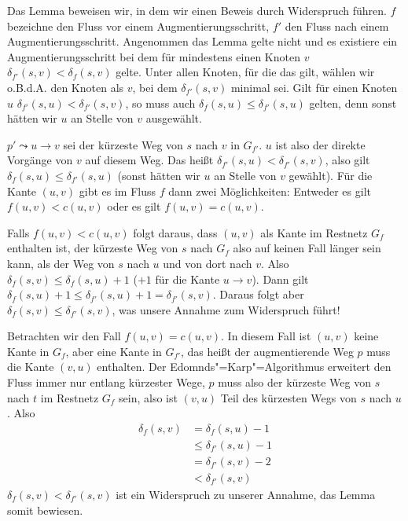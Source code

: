 \begin{Bew}
  \hspace{\parindent} Das Lemma beweisen wir, in dem wir einen Beweis durch Widerspruch führen. $f$ bezeichne den Fluss vor einem Augmentierungsschritt, $f'$ den Fluss nach einem Augmentierungsschritt. Angenommen das Lemma gelte nicht und es existiere ein Augmentierungsschritt bei dem für mindestens einen Knoten $v$ $\delta_{f'}(s,v) < \delta_{f}(s,v)$ gelte. Unter allen Knoten, für die das gilt, wählen wir o.B.d.A. den Knoten als $v$, bei dem $\delta_{f'}(s,v)$ minimal sei. Gilt für einen Knoten $u$ $\delta_{f'}(s,u) < \delta_{f'}(s,v)$, so muss auch $\delta_f(s,u) \le \delta_{f'}(s,u)$ gelten, denn sonst hätten wir $u$ an Stelle von $v$ ausgewählt.
  
  $p' \leadsto u \to v$ sei der kürzeste Weg von $s$ nach $v$ in $G_{f'}$. $u$ ist also der direkte Vorgänge von $v$ auf diesem Weg. Das heißt $\delta_{f'}(s, u) < \delta_{f'}(s,v)$, also gilt $\delta_{f}(s,u) \le \delta_{f'} (s,u)$ (sonst hätten wir $u$ an Stelle von $v$ gewählt). Für die Kante $(u,v)$ gibt es im Fluss $f$ dann zwei Möglichkeiten: Entweder es gilt $f(u,v) < c(u,v)$ oder es gilt $f(u,v) = c(u, v)$.
  
  Falls $f(u,v) < c(u,v)$ folgt daraus, dass $(u,v)$ als Kante im Restnetz $G_f$ enthalten ist, der kürzeste Weg von $s$ nach $G_f$ also auf keinen Fall länger sein kann, als der Weg von $s$ nach $u$ und von dort nach $v$. Also $\delta_{f}(s,v) \le \delta_{f}(s,u) + 1$ ($+1$ für die Kante $u \to v$). Dann gilt $\delta_{f}(s, u) + 1 \le \delta_{f'}(s,u) +1 = \delta_{f'}(s,v)$. Daraus folgt aber $\delta_{f}(s,v) \le \delta_{f'}(s,v)$, was unsere Annahme zum Widerspruch führt!
  
  Betrachten wir den Fall $f(u,v) = c(u,v)$. In diesem Fall ist $(u,v)$ keine Kante in $G_f$, aber eine Kante in $G_{f'}$, das heißt der augmentierende Weg $p$ muss die Kante $(v,u)$ enthalten. Der Edomnds"=Karp"=Algorithmus erweitert den Fluss immer nur entlang kürzester Wege, $p$ muss also der kürzeste Weg von $s$ nach $t$ im Restnetz $G_{f}$ sein, also ist $(v, u)$ Teil des kürzesten Wegs von $s$ nach $u$. Also
    \begin{align*}
      \delta_f(s,v) &= \delta_f(s,u) - 1 \\
                    &\le \delta_{f'}(s,u) -1 \\
                    &= \delta_{f'}(s,v) -2\\
                    &< \delta_{f'}(s,v)
    \end{align*}
    $\delta_f(s,v) < \delta_{f'}(s,v)$ ist ein Widerspruch zu unserer Annahme, das Lemma somit bewiesen.
\end{Bew}

